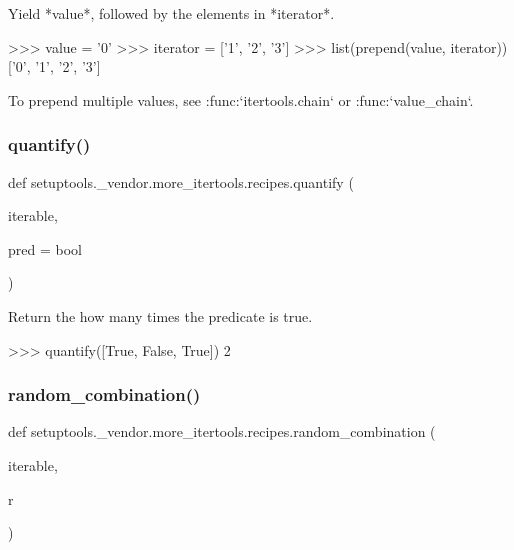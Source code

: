 \begin{DoxyVerb}Yield *value*, followed by the elements in *iterator*.

    >>> value = '0'
    >>> iterator = ['1', '2', '3']
    >>> list(prepend(value, iterator))
    ['0', '1', '2', '3']

To prepend multiple values, see :func:`itertools.chain`
or :func:`value_chain`.\end{DoxyVerb}
 \mbox{\label{namespacesetuptools_1_1__vendor_1_1more__itertools_1_1recipes_a9e99a1496ad04f2d697e49f7d1cf209c}} 
\subsubsection{\texorpdfstring{quantify()}{quantify()}}
{\footnotesize\ttfamily def setuptools.\+\_\+vendor.\+more\+\_\+itertools.\+recipes.\+quantify (\begin{DoxyParamCaption}\item[{}]{iterable,  }\item[{}]{pred = {\ttfamily bool} }\end{DoxyParamCaption})}

\begin{DoxyVerb}Return the how many times the predicate is true.

>>> quantify([True, False, True])
2\end{DoxyVerb}
 \mbox{\label{namespacesetuptools_1_1__vendor_1_1more__itertools_1_1recipes_a84bf2dc121358001d3d4aaa1feb21f10}} 
\subsubsection{\texorpdfstring{random\+\_\+combination()}{random\_combination()}}
{\footnotesize\ttfamily def setuptools.\+\_\+vendor.\+more\+\_\+itertools.\+recipes.\+random\+\_\+combination (\begin{DoxyParamCaption}\item[{}]{iterable,  }\item[{}]{r }\end{DoxyParamCaption})}

